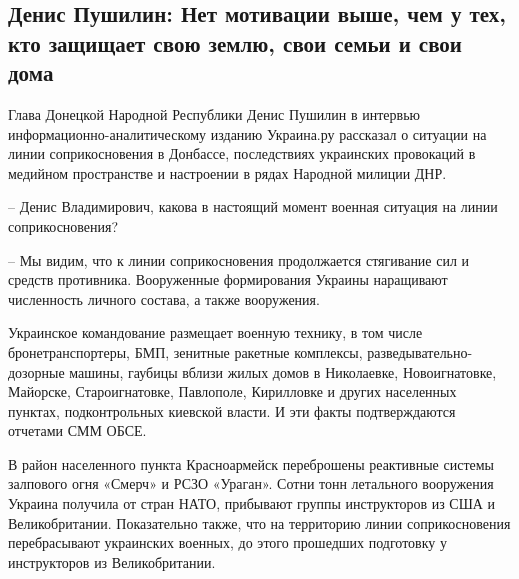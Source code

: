  
 
 
 
 
 
\subsection{Денис Пушилин: Нет мотивации выше, чем у тех, кто защищает свою землю, свои семьи и свои дома}
\label{sec:27_01_2022.stz.ludi.dnr.pushilin_denis.1.net_motivacii_vyshe}
 

\begin{zznagolos}
Глава Донецкой Народной Республики Денис Пушилин в интервью
информационно-аналитическому изданию Украина.ру рассказал о ситуации на линии
соприкосновения в Донбассе, последствиях украинских провокаций в медийном
пространстве и настроении в рядах Народной милиции ДНР. 	
\end{zznagolos}

– Денис Владимирович, какова в настоящий момент военная ситуация на линии
соприкосновения?

– Мы видим, что к линии соприкосновения продолжается стягивание сил и средств
противника. Вооруженные формирования Украины наращивают численность личного
состава, а также вооружения.


Украинское командование размещает военную технику, в том числе
бронетранспортеры, БМП, зенитные ракетные комплексы, разведывательно-дозорные
машины, гаубицы вблизи жилых домов в Николаевке, Новоигнатовке, Майорске,
Староигнатовке, Павлополе, Кирилловке и других населенных пунктах,
подконтрольных киевской власти. И эти факты подтверждаются отчетами СММ ОБСЕ.

В район населенного пункта Красноармейск переброшены реактивные системы
залпового огня «Смерч» и РСЗО «Ураган». Сотни тонн летального вооружения
Украина получила от стран НАТО, прибывают группы инструкторов из США и
Великобритании. Показательно также, что на территорию линии соприкосновения
перебрасывают украинских военных, до этого прошедших подготовку у инструкторов
из Великобритании.

